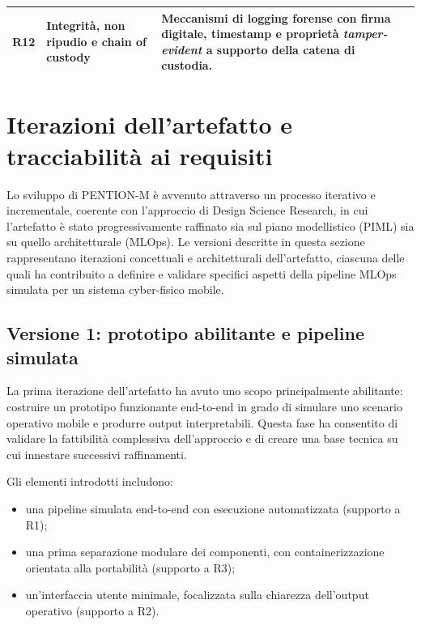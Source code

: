 \begin{longtable}{>{\bfseries}p{1cm} p{4cm} p{7cm}}
    R12 & Integrità, non ripudio e chain of custody         &
    Meccanismi di logging forense con firma digitale, timestamp e proprietà \emph{tamper-evident} a supporto della catena di custodia.                                                                                                                                                                                                                                                                                                                \\
    \bottomrule
\end{longtable}

\section{Iterazioni dell'artefatto e tracciabilità ai requisiti}
\label{sec:artifact_iterations}

Lo sviluppo di PENTION-M è avvenuto attraverso un processo iterativo e incrementale, coerente con l'approccio di Design Science Research, in cui l’artefatto è stato progressivamente raffinato sia sul piano modellistico (PIML) sia su quello architetturale (MLOps).
Le versioni descritte in questa sezione rappresentano iterazioni concettuali e architetturali dell’artefatto, ciascuna delle quali ha contribuito a definire e validare specifici aspetti della pipeline MLOps simulata per un sistema cyber-fisico mobile.

\subsection{Versione 1: prototipo abilitante e pipeline simulata}
\label{subsec:iter_v1}

La prima iterazione dell’artefatto ha avuto uno scopo principalmente abilitante: costruire un prototipo funzionante end-to-end in grado di simulare uno scenario operativo mobile e produrre output interpretabili.
Questa fase ha consentito di validare la fattibilità complessiva dell’approccio e di creare una base tecnica su cui innestare successivi raffinamenti.

Gli elementi introdotti includono:
\begin{itemize}
    \item una pipeline simulata end-to-end con esecuzione automatizzata (supporto a R1);
    \item una prima separazione modulare dei componenti, con containerizzazione orientata alla portabilità (supporto a R3);
    \item un'interfaccia utente minimale, focalizzata sulla chiarezza dell’output operativo (supporto a R2).
\end{itemize}

